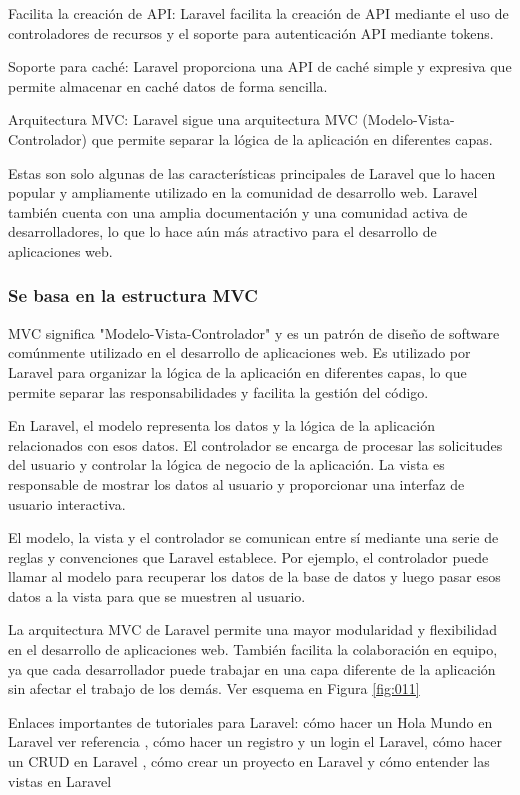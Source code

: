 \documentclass{article}
\begin{document}
\begin{enumerate}
Facilita la creación de API: Laravel facilita la creación de API mediante el uso de controladores de recursos y el soporte para autenticación API mediante tokens.

Soporte para caché: Laravel proporciona una API de caché simple y expresiva que permite almacenar en caché datos de forma sencilla.

Arquitectura MVC: Laravel sigue una arquitectura MVC (Modelo-Vista-Controlador) que permite separar la lógica de la aplicación en diferentes capas.

Estas son solo algunas de las características principales de Laravel que lo hacen popular y ampliamente utilizado en la comunidad de desarrollo web. Laravel también cuenta con una amplia documentación y una comunidad activa de desarrolladores, lo que lo hace aún más atractivo para el desarrollo de aplicaciones web.

\subsubsection{Se basa en la estructura MVC}
MVC significa "Modelo-Vista-Controlador" y es un patrón de diseño de software comúnmente utilizado en el desarrollo de aplicaciones web. Es utilizado por Laravel para organizar la lógica de la aplicación en diferentes capas, lo que permite separar las responsabilidades y facilita la gestión del código.

En Laravel, el modelo representa los datos y la lógica de la aplicación relacionados con esos datos. El controlador se encarga de procesar las solicitudes del usuario y controlar la lógica de negocio de la aplicación. La vista es responsable de mostrar los datos al usuario y proporcionar una interfaz de usuario interactiva.

El modelo, la vista y el controlador se comunican entre sí mediante una serie de reglas y convenciones que Laravel establece. Por ejemplo, el controlador puede llamar al modelo para recuperar los datos de la base de datos y luego pasar esos datos a la vista para que se muestren al usuario.

La arquitectura MVC de Laravel permite una mayor modularidad y flexibilidad en el desarrollo de aplicaciones web. También facilita la colaboración en equipo, ya que cada desarrollador puede trabajar en una capa diferente de la aplicación sin afectar el trabajo de los demás. Ver esquema en Figura \ref{fig:011}

Enlaces importantes de tutoriales para Laravel: cómo hacer un Hola Mundo en Laravel ver referencia \cite{HolaMundoLaravel}, cómo hacer un registro y un login el Laravel\cite{registroYlogin}, cómo hacer un CRUD en Laravel \cite{CRUDLaravel}, cómo crear un proyecto en Laravel \cite{Laravel10CrearProyecto} y cómo entender las vistas en Laravel\cite{Laravel10Vistas}



\end{enumerate}
\end{document}
